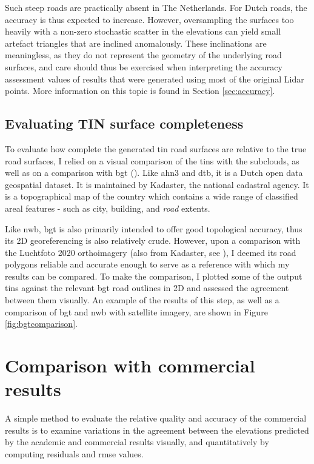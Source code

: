 Such steep roads are practically absent in The Netherlands. For Dutch roads, the accuracy is thus expected to increase. However, oversampling the surfaces too heavily with a non-zero stochastic scatter in the elevations can yield small artefact triangles that are inclined anomalously. These inclinations are meaningless, as they do not represent the geometry of the underlying road surfaces, and care should thus be exercised when interpreting the accuracy assessment values of results that were generated using most of the original Lidar points. More information on this topic is found in Section \ref{sec:accuracy}.

\subsection{Evaluating TIN surface completeness}
\label{sub:m_accuracycompleteness}

To evaluate how complete the generated \ac{tin} road surfaces are relative to the true road surfaces, I relied on a visual comparison of the \ac{tin}s with the subclouds, as well as on a comparison with \ac{bgt} (\cite{bgt_homepage}). Like \ac{ahn3} and \ac{dtb}, it is a Dutch open data geospatial dataset. It is maintained by Kadaster, the national cadastral agency. It is a topographical map of the country which contains a wide range of classified areal features - such as city, building, and \textit{road} extents.

Like \ac{nwb}, \ac{bgt} is also primarily intended to offer good topological accuracy, thus its 2D georeferencing is also relatively crude. However, upon a comparison with the Luchtfoto 2020 orthoimagery (also from Kadaster, see \cite{luchtfoto_pdok}), I deemed its road polygons reliable and accurate enough to serve as a reference with which my results can be compared. To make the comparison, I plotted some of the output \ac{tin}s against the relevant \ac{bgt} road outlines in 2D and assessed the agreement between them visually. An example of the results of this step, as well as a comparison of \ac{bgt} and \ac{nwb} with satellite imagery, are shown in Figure \ref{fig:bgtcomparison}.

\section{Comparison with commercial results}
\label{sec:m_comparison}

A simple method to evaluate the relative quality and accuracy of the commercial results is to examine variations in the agreement between the elevations predicted by the academic and commercial results visually, and quantitatively by computing residuals and \ac{rmse} values.

